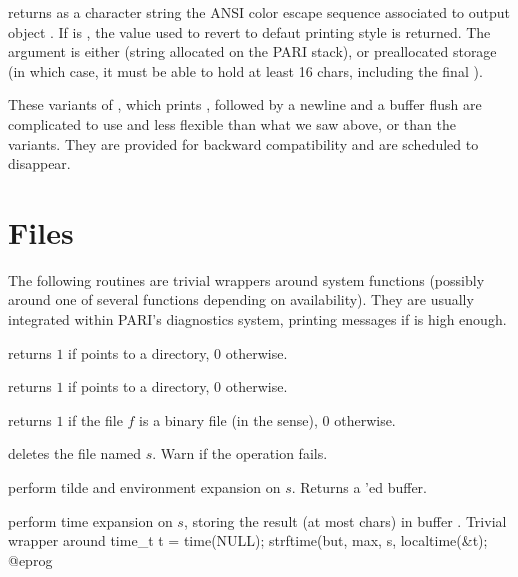  returns as a character
string the ANSI color escape sequence associated to output object .
If  is , the value used to revert to defaut printing
style is returned. The argument  is either  (string
allocated on the PARI stack), or preallocated storage (in which case, it must
be able to hold at least 16 chars, including the final ).


These variants of , which prints , followed by
a newline and a buffer flush are complicated to use and less flexible
than what we saw above, or than the  variants. They are
provided for backward compatibility and are scheduled to disappear.




\section{Files}

The following routines are trivial wrappers around system functions
(possibly around one of several functions depending on availability).
They are usually integrated within PARI's diagnostics system, printing
messages if  is high enough.

 returns $1$ if  points to
a directory, $0$ otherwise.

 returns $1$ if  points to
a directory, $0$ otherwise.

 returns $1$ if the file $f$ is a binary
file (in the  sense), $0$ otherwise.

 deletes the file named $s$. Warn
if the operation fails.

 perform tilde and environment expansion
on $s$. Returns a 'ed buffer.

 perform
time expansion on $s$, storing the result (at most  chars) in
buffer . Trivial wrapper around
\bprog
  time_t t = time(NULL);
  strftime(but, max, s, localtime(&t);
@eprog

